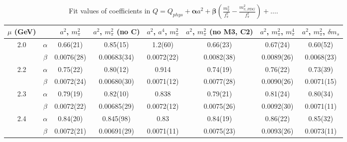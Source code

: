 \documentclass[12pt]{extarticle}
\begin{document}
\begin{table}[h!]
\begin{center}
\begin{tabular}{|c c|c|c|c|c|c|c|}
\hline
$\mu$ (GeV) &  & $a^2$, $m_\pi^2$& $a^2$, $m_\pi^2$ (no C)& $a^2$, $a^4$, $m_\pi^2$& $a^2$, $m_\pi^2$ (no M3, C2)& $a^2$, $m_\pi^2$, $m_\pi^4$& $a^2$, $m_\pi^2$, $\delta m_s$\\
\hline
\multirow{2}{0.5in}{2.0} & $\alpha$ & 0.66(21)& 0.85(15)& 1.2(60)& 0.66(23)& 0.67(24)& 0.60(52)\\
 & $\beta$ & 0.0076(28)& 0.00683(34)& 0.0072(22)& 0.0082(38)& 0.0089(26)& 0.0068(23)\\
\hline
\multirow{2}{0.5in}{2.2} & $\alpha$ & 0.75(22)& 0.80(12)& 0.914& 0.74(19)& 0.76(22)& 0.73(39)\\
 & $\beta$ & 0.0072(24)& 0.00680(30)& 0.0071(12)& 0.0077(28)& 0.0090(26)& 0.0071(15)\\
\hline
\multirow{2}{0.5in}{2.3} & $\alpha$ & 0.79(19)& 0.82(10)& 0.838& 0.79(21)& 0.81(24)& 0.80(34)\\
 & $\beta$ & 0.0072(22)& 0.00685(29)& 0.0072(12)& 0.0075(26)& 0.0092(30)& 0.0071(11)\\
\hline
\multirow{2}{0.5in}{2.4} & $\alpha$ & 0.84(20)& 0.845(98)& 0.83& 0.84(19)& 0.86(22)& 0.85(32)\\
 & $\beta$ & 0.0072(21)& 0.00691(29)& 0.0071(11)& 0.0075(23)& 0.0093(26)& 0.0073(11)\\
\hline
\end{tabular}
\caption{Fit values of coefficients in $Q = Q_{phys} + \mathbf{\alpha} a^2 + \mathbf{\beta}\left(\frac{m_\pi^2}{f_\pi^2}-\frac{m_{\pi,PDG}^2}{f_\pi^2}\right) + \ldots$.}
\end{center}
\end{table}
























\clearpage
\end{document}
